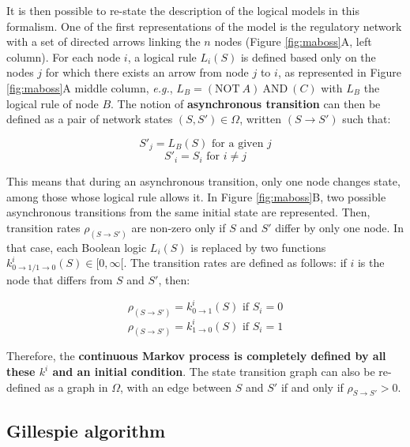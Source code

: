 \documentclass[a4paper,12pt,twoside,onecolumn,openright,final,oldfontcommands]{memoir}
\begin{document}
It is then possible to re-state the description of the logical models in
this formalism. One of the first representations of the model is the
regulatory network with a set of directed arrows linking the \(n\) nodes
(Figure \ref{fig:maboss}A, left column). For each node \(i\), a logical
rule \(L_i(S)\) is defined based only on the nodes \(j\) for which there
exists an arrow from node \(j\) to \(i\), as represented in Figure
\ref{fig:maboss}A middle column, \emph{e.g.},
\(L_B = (\text{NOT}~A)~\text{AND}~(C)\) with \(L_B\) the logical rule of
node \(B\). The notion of \textbf{asynchronous transition} can then be
defined as a pair of network states \((S, S') \in \Omega\), written
\((S \rightarrow S')\) such that:

\[S'_j=L_B(S) \text{ for a given } j\]
\[S'_i=S_i \text{ for } i \neq j\]

This means that during an asynchronous transition, only one node changes
state, among those whose logical rule allows it. In Figure
\ref{fig:maboss}B, two possible asynchronous transitions from the same
initial state are represented. Then, transition rates
\(\rho_{(S \rightarrow S')}\) are non-zero only if \(S\) and \(S'\)
differ by only one node. In that case, each Boolean logic \(L_i(S)\) is
replaced by two functions
\(k_{0 \rightarrow 1 / 1 \rightarrow 0}^{i}(S) \in [0, \infty[\). The
transition rates are defined as follows: if \(i\) is the node that
differs from \(S\) and \(S'\), then:

\[\rho_{(S \rightarrow S')}=k_{0 \rightarrow 1}^{i}(S) \text{ if } S_i=0\]
\[\rho_{(S \rightarrow S')}=k_{1 \rightarrow 0}^{i}(S) \text{ if } S_i=1\]

Therefore, the \textbf{continuous Markov process is completely defined
by all these \(k^i\) and an initial condition}. The state transition
graph can also be re-defined as a graph in \(\Omega\), with an edge
between \(S\) and \(S'\) if and only if \(\rho_{S \rightarrow S'} > 0\).

\subsection{Gillespie algorithm}\label{gillespie-algorithm}
\end{document}
